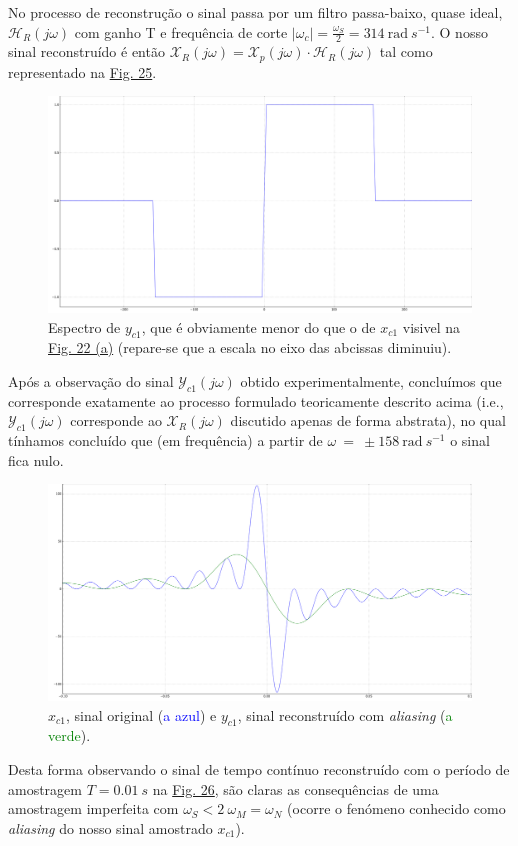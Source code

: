 No processo de reconstrução o sinal passa por um filtro passa-baixo, quase ideal, \(\mathcal{H}_R(j\omega)\) com ganho T e frequência de corte \(\vert \omega_c\vert = \frac{\omega_S}{2} = 314\ \text{rad}\ s^{-1}\). O nosso sinal reconstruído é então \(\mathcal{X}_R(j\omega) = \mathcal{X}_p(j\omega) \cdot \mathcal{H}_R(j\omega)\) tal como representado na \hyperref[fig:YC1]{Fig. 25}. 

\clearpage

\begin{figure}[ht]
    \centering
    \includegraphics[width = 0.5\linewidth]{prints/YC1.png}   
    \caption{Espectro de \(y_{c1}\), que é obviamente menor do que o de \(x_{c1}\) visivel na \hyperref[fig:imag_XC1]{Fig. 22 (a)} (repare-se que a escala no eixo das abcissas diminuiu).}
    \label{fig:YC1}
\end{figure}

Após a observação do sinal \(\mathcal{Y}_{c1}(j\omega)\) obtido experimentalmente, concluímos que corresponde exatamente ao processo formulado teoricamente descrito acima (i.e., \(\mathcal{Y}_{c1}(j\omega)\) corresponde ao \(\mathcal{X}_R(j\omega)\) discutido apenas de forma abstrata), no qual tínhamos concluído que (em frequência) a partir de \(\omega\ =\ \pm158\ \text{rad}\ s^{-1}\) o sinal fica nulo.

\begin{figure}[ht]
    \centering
    \includegraphics[width = 0.5\linewidth]{prints/yc.png}   
    \caption{\(x_{c1}\), sinal original (\textcolor{Blue}{a azul}) e \(y_{c1}\), sinal reconstruído com \textit{aliasing} (\textcolor{Green}{a verde}).}
    \label{fig:yc}
\end{figure}

Desta forma observando  o sinal de tempo contínuo reconstruído com o período de amostragem \(T = 0.01\ s\) na \hyperref[fig:yc]{Fig. 26}, são claras as consequências de uma amostragem imperfeita com \(\omega_S < 2\ \omega_M = \omega_N\) (ocorre o fenómeno conhecido como \textit{aliasing} do nosso sinal amostrado \(x_{c1}\)).
